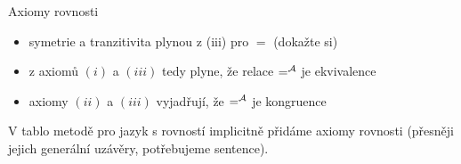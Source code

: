 \documentclass{beamer}
\begin{document}
\begin{frame}{Axiomy rovnosti}


    \begin{itemize}
        \item symetrie a tranzitivita plynou z (iii) pro $=$ (dokažte si)
        \item z axiomů $(i)$ a $(iii)$ tedy plyne, že relace $=^{\mathcal{A}}$ je ekvivalence
        \item axiomy $(ii)$ a $(iii)$ vyjadřují, že $=^{\mathcal{A}}$ je kongruence
    \end{itemize}

        V tablo metodě pro jazyk s rovností implicitně přidáme axiomy rovnosti (přesněji jejich generální uzávěry, potřebujeme sentence).

     
    
    

   
    
    

\end{frame}
\end{document}
